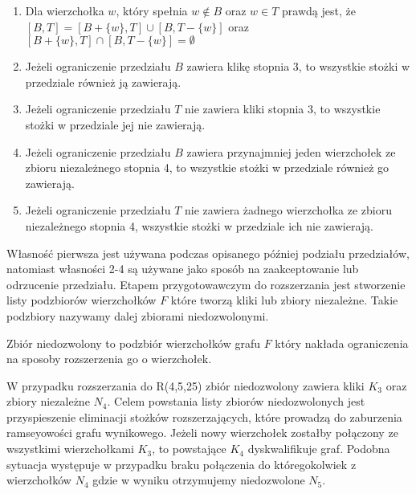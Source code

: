 \begin{enumerate}

\item Dla wierzchołka $w$, który spełnia $w \notin B$ oraz $w\in T$ prawdą jest, że $[B, T] = [B + \{ w\}, T] \cup [B , T - \{ w\}]$ oraz $[B +\{ w\}, T] \cap [B , T - \{ w\}] = \emptyset$

\item Jeżeli ograniczenie przedziału $B$ zawiera klikę stopnia 3, to wszystkie stożki w przedziale również ją zawierają. 

\item Jeżeli ograniczenie przedziału $T$ nie zawiera kliki stopnia 3, to wszystkie stożki w przedziale jej nie zawierają.

																													  
				 
\item Jeżeli ograniczenie przedziału $B$ zawiera przynajmniej jeden wierzchołek ze zbioru niezależnego stopnia 4, to wszystkie stożki w przedziale również go zawierają. 

\item Jeżeli ograniczenie przedziału $T$ nie zawiera żadnego wierzchołka ze zbioru niezależnego stopnia 4, wszystkie stożki w przedziale ich nie zawierają. 

\end {enumerate}

Własność pierwsza jest używana podczas opisanego później podziału przedziałów, natomiast własności 2-4 są używane jako sposób na zaakceptowanie lub odrzucenie przedziału.
Etapem przygotowawczym do rozszerzania jest stworzenie listy podzbiorów wierzchołków $F$ które tworzą kliki lub zbiory niezależne. Takie podzbiory nazywamy dalej zbiorami niedozwolonymi. 

\begin{definition} Zbiór niedozwolony to podzbiór wierzchołków grafu $F$ który nakłada ograniczenia na sposoby rozszerzenia go o wierzchołek.
\end{definition}

W przypadku rozszerzania do R(4,5,25) zbiór niedozwolony zawiera kliki $K_3$ oraz zbiory niezależne $N_4$. Celem powstania listy zbiorów niedozwolonych jest przyspieszenie eliminacji stożków rozszerzających, które prowadzą do zaburzenia ramseyowości grafu wynikowego. Jeżeli nowy wierzchołek zostałby połączony ze wszystkimi wierzchołkami $K_3$, to powstające $K_4$ dyskwalifikuje graf. Podobna sytuacja występuje w przypadku braku połączenia do któregokolwiek z wierzchołków $N_4$ gdzie w wyniku otrzymujemy niedozwolone $N_5$. 

